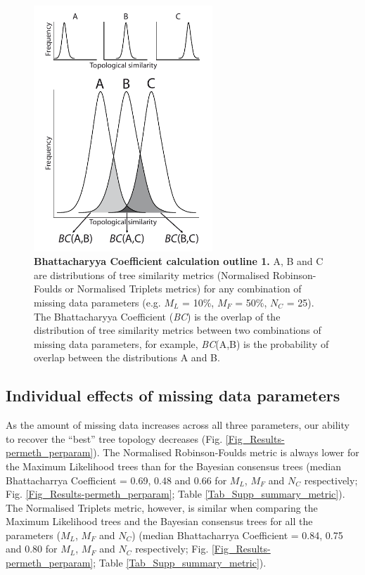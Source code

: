  \begin{figure}[!h] %
 \centering
     \includegraphics[width=0.6\textwidth]{TEM/Figures/Fig2.pdf}
 \caption[Bhattacharyya Coefficient calculation outline 1]{\textbf{Bhattacharyya Coefficient calculation outline 1.} A, B and C are distributions of tree similarity metrics (Normalised Robinson-Foulds or Normalised Triplets metrics) for any combination of missing data parameters (e.g. $M_{L}$ = 10\%, $M_{F}$ = 50\%, $N_{C}$ = 25). The Bhattacharyya Coefficient (\textit{BC}) is the overlap of the distribution of tree similarity metrics between two combinations of missing data parameters, for example, \textit{BC}(A,B) is the probability of overlap between the distributions A and B.}
 \label{Fig_Bhattacharyya_Coefficients1}
 \end{figure}

\subsection{Individual effects of missing data parameters}
As the amount of missing data increases across all three parameters, our ability to recover the ``best'' tree topology decreases (Fig. \ref{Fig_Results-permeth_perparam}).
The Normalised Robinson-Foulds metric is always lower for the Maximum Likelihood trees than for the Bayesian consensus trees (median Bhattacharrya Coefficient = 0.69, 0.48 and 0.66 for $M_{L}$, $M_{F}$ and $N_{C}$ respectively; Fig. \ref{Fig_Results-permeth_perparam}; Table \ref{Tab_Supp_summary_metric}). 
The Normalised Triplets metric, however, is similar when comparing the Maximum Likelihood trees and the Bayesian consensus trees for all the parameters ($M_{L}$, $M_{F}$ and $N_{C}$) (median Bhattacharrya Coefficient = 0.84, 0.75 and 0.80 for $M_{L}$, $M_{F}$ and $N_{C}$ respectively; Fig. \ref{Fig_Results-permeth_perparam}; Table \ref{Tab_Supp_summary_metric}).

